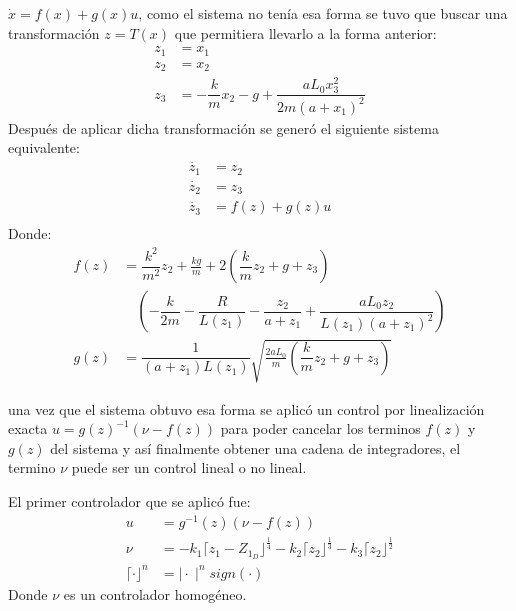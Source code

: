 \documentclass[onecolumn,10pt]{article}
\begin{document}
$\dot{x}=f(x)+g(x)u$, como el sistema no ten\'ia esa forma se tuvo que buscar una transformaci\'on $z=T(x)$  que permitiera llevarlo a la forma anterior:
\begin{equation*}
\begin{split}
z_1&=x_1 \\
z_2&=x_2 \\
z_3&=- \dfrac{k}{m} x_2 - g+ \dfrac{aL_0x_3^{2}}{2m(a+x_1)^{2}}
\end{split}
\end{equation*}
Despu\'es de aplicar dicha transformaci\'on se gener\'o el siguiente sistema equivalente:
\begin{equation*}
\begin{split}
\dot{z_1}&=z_2 \\
\dot{z_2}&=z_3 \\
\dot{z_3}&=f(z)+g(z)u\\
\end{split}
\end{equation*}
Donde:
\begin{equation*}
\begin{split}
f(z)&=\dfrac{k^{2}}{m^{2}}z_2+\frac{kg}{m}+2(\dfrac{k}{m}z_2+g+z_3)\\
    &\quad(-\dfrac{k}{2m}-\dfrac{R}{L(z_1)}-\dfrac{z_2}{a+z_1}+\dfrac{aL_0z_2}{L(z_1)(a+z_1)^{2}})\\
g(z)&=\dfrac{1}{(a+z_1)L(z_1)} \sqrt{ \frac{2aL_0}{m}( \dfrac{k}{m} z_2+g+z_3)}
\end{split}
\end{equation*}

una vez que el sistema obtuvo esa forma se aplic\'o un control  por linealizaci\'on exacta $u=g(z)^{-1}(\nu-f(z))$ para poder cancelar los terminos $f(z)$ y $g(z)$ del sistema y as\'i finalmente obtener una cadena de integradores, el termino $\nu$ puede ser un control lineal o no lineal.

El primer controlador que se aplic\'o fue:
\begin{equation*}
\begin{split}
 u&=g^{-1}(z)(\nu-f(z))\\
 \nu&=-k_1\lceil z_1-Z_{1_{D}} \rfloor ^{\frac{1}{4}}-k_2\lceil z_2 \rfloor ^{\frac{1}{3}}-k_3\lceil z_2 \rfloor ^{\frac{1}{2}} \\
 \lceil\cdot\rfloor^{n}&=\mid \cdot \mid^{n} sign(\cdot)
\end{split}
\end{equation*}
Donde $\nu$ es un controlador homog\'eneo.
\end{document}
